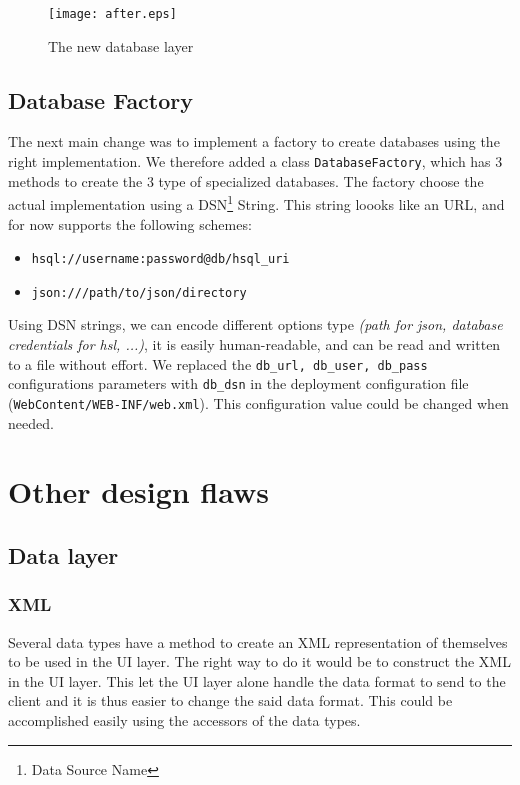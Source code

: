 \begin{figure}[!h]
  \texttt{[image: after.eps]}
  \caption{The new database layer}
\end{figure}

\subsection{Database Factory}
The next main change was to implement a factory to create databases using the
right implementation. We therefore added a class \texttt{DatabaseFactory}, which
has 3 methods to create the 3 type of specialized databases. The factory choose
the actual implementation using a DSN\footnote{Data Source Name} String. This string
loooks like an URL, and for now supports the following schemes:
\begin{itemize}
  \item \texttt{hsql://username:password@db/hsql\_uri}
  \item \texttt{json:///path/to/json/directory}
\end{itemize}

Using DSN strings, we can encode different options type \textit{(path for json, database credentials for hsl, ...)}, it is easily human-readable, and can be read and written to a file without effort. We replaced the \texttt{db\_url, db\_user, db\_pass} configurations parameters with \texttt{db\_dsn} in the deployment configuration file (\texttt{WebContent/WEB-INF/web.xml}). This configuration value could be changed when needed.


\section{Other design flaws}

\subsection{Data layer}

\subsubsection{XML}
Several data types have a method to create an XML representation of themselves to be used in the UI layer. The right way to do it would be to construct the XML in the UI layer. This let the UI layer alone handle the data format to send to the client and it is thus easier to change the said data format. This could be accomplished easily using the accessors of the data types.

